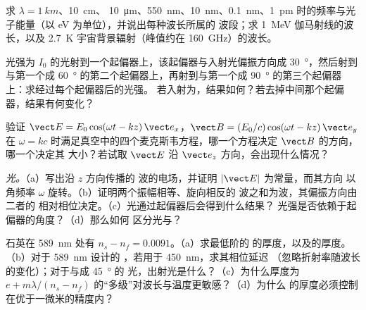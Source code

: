 \begin{exercise}[$\star$]\label{exo:b2:plane-waves-polarization:2}
求 $\lambda = \qty{1}{km}$、\qty{10}{cm}、
\qty{10}{\micro m}、\qty{550}{nm}、\qty{10}{nm}、\qty{0.1}{nm}、\qty{1}{pm} 时的频率与光子能量（以 eV 为单位），并说出每种波长所属的
波段；求 \qty{1}{MeV} 伽马射线的波长，以及
\qty{2.7}{K} 宇宙背景辐射（峰值约在 \qty{160}{GHz}）的波长。
\end{exercise}

\begin{exercise}[$\star$]\label{exo:b2:plane-waves-polarization:3}
光强为 $I_0$ 的光射到一个起偏器上，该起偏器与入射光偏振方向成
\qty{30}{\degree}，然后射到与第一个成 \qty{60}{\degree} 的第二个起偏器上，再射到与第一个成
\qty{90}{\degree} 的第三个起偏器上：求经过每个起偏器后的光强。
若入射为，结果如何？若去掉中间那个起偏器，结果有何变化？
\end{exercise}

\begin{exercise}[$\star$]\label{exo:b2:plane-waves-polarization:4}
验证 $\vect E = E_0\cos(\omega t - kz)\,\vect e_x$，$\vect B = (E_0/c)\cos(\omega t
- kz)\,\vect e_y$ 在 $\omega =
kc$ 时满足真空中的四个麦克斯韦方程，哪一个方程决定 $\vect B$ 的方向，哪一个决定其
大小？若试取 $\vect E$ 沿 $\vect e_z$ 方向，会出现什么情况？
\end{exercise}

\begin{exercise}[$\star\star$]\label{exo:b2:plane-waves-polarization:5}
\emph{光。}（a）写出沿 $z$ 方向传播的
波的电场，并证明 $|\vect E|$ 为常量，而其方向
以角频率 $\omega$ 旋转。（b）证明两个振幅相等、旋向相反的
波之和为波，其偏振方向由二者的
相对相位决定。（c）光通过起偏器后会得到什么结果？
光强是否依赖于起偏器的角度？（d）那么如何
区分光与？
\end{exercise}

\begin{exercise}[$\star\star$]\label{exo:b2:plane-waves-polarization:6}
石英在 \qty{589}{nm} 处有 $n_s - n_f = 0.0091$。（a）求最低阶的
的厚度，以及的厚度。（b）对于 \qty{589}{nm} 设计的
，若用于 \qty{450}{nm}，求其相位延迟
（忽略折射率随波长的变化）；对于与成 \qty{45}{\degree} 的
光，出射光是什么？（c）为什么厚度为 $e +
m\lambda/(n_s - n_f)$ 的“多级”对波长与温度更敏感？（d）为什么
的厚度必须控制在优于一微米的精度内？
\end{exercise}

